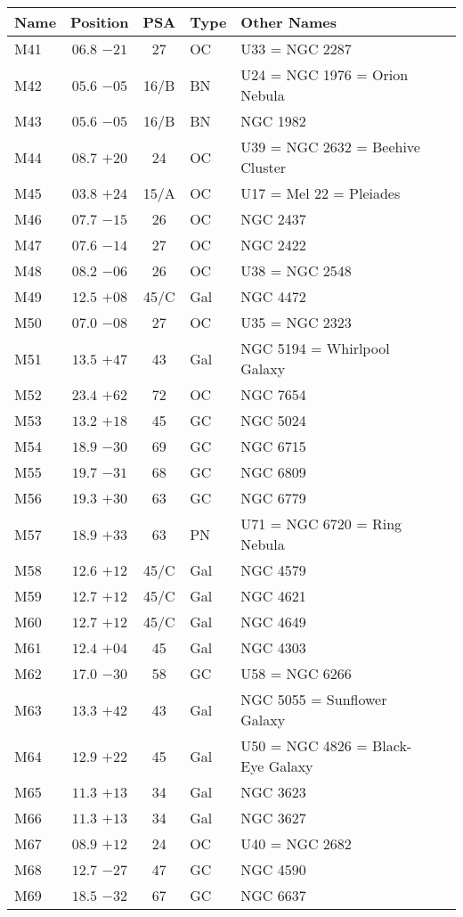 \begin{table}[t]
\setlength{\tabcolsep}{3pt}
\small
\begin{tabular}{lcclll}
\hline
Name&Position&PSA&Type&Other Names\\
\hline
M41  &$06.8$ $-21$&27&OC &U33 = NGC 2287\\
M42  &$05.6$ $-05$&16/B&BN &U24 = NGC 1976 = Orion Nebula\\
M43  &$05.6$ $-05$&16/B&BN &NGC 1982\\
M44  &$08.7$ $+20$&24&OC &U39 = NGC 2632 = Beehive Cluster\\
M45  &$03.8$ $+24$&15/A&OC &U17 = Mel 22 = Pleiades\\
M46  &$07.7$ $-15$&26&OC &NGC 2437\\
M47  &$07.6$ $-14$&27&OC &NGC 2422\\
M48  &$08.2$ $-06$&26&OC &U38 = NGC 2548\\
M49  &$12.5$ $+08$&45/C&Gal&NGC 4472\\
M50  &$07.0$ $-08$&27&OC &U35 = NGC 2323\\
M51  &$13.5$ $+47$&43&Gal&NGC 5194 = Whirlpool Galaxy\\
M52  &$23.4$ $+62$&72&OC &NGC 7654\\
M53  &$13.2$ $+18$&45&GC &NGC 5024\\
M54  &$18.9$ $-30$&69&GC &NGC 6715\\
M55  &$19.7$ $-31$&68&GC &NGC 6809\\
M56  &$19.3$ $+30$&63&GC &NGC 6779\\
M57  &$18.9$ $+33$&63&PN &U71 = NGC 6720 = Ring Nebula\\
M58  &$12.6$ $+12$&45/C&Gal&NGC 4579\\
M59  &$12.7$ $+12$&45/C&Gal&NGC 4621\\
M60  &$12.7$ $+12$&45/C&Gal&NGC 4649\\
M61  &$12.4$ $+04$&45&Gal&NGC 4303\\
M62  &$17.0$ $-30$&58&GC &U58 = NGC 6266\\
M63  &$13.3$ $+42$&43&Gal&NGC 5055 = Sunflower Galaxy\\
M64  &$12.9$ $+22$&45&Gal&U50 = NGC 4826 = Black-Eye Galaxy\\
M65  &$11.3$ $+13$&34&Gal&NGC 3623\\
M66  &$11.3$ $+13$&34&Gal&NGC 3627\\
M67  &$08.9$ $+12$&24&OC &U40 = NGC 2682\\
M68  &$12.7$ $-27$&47&GC &NGC 4590\\
M69  &$18.5$ $-32$&67&GC &NGC 6637\\

\end{tabular}
\end{table}
